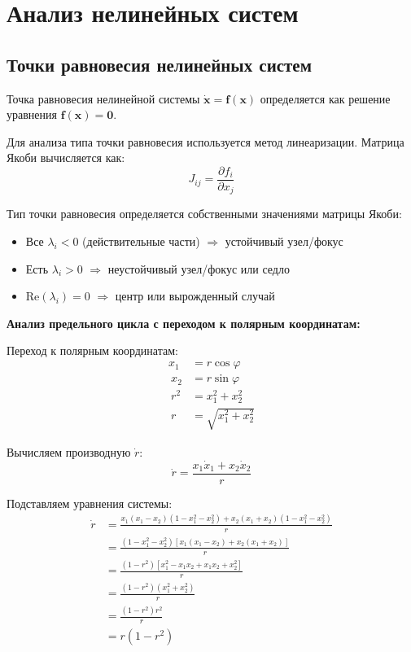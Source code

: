 \section*{Анализ нелинейных систем}

\subsection*{Точки равновесия нелинейных систем}

Точка равновесия нелинейной системы $\dot{\mathbf{x}} = \mathbf{f}(\mathbf{x})$ определяется как решение уравнения $\mathbf{f}(\mathbf{x}) = \mathbf{0}$.

Для анализа типа точки равновесия используется метод линеаризации. Матрица Якоби вычисляется как:
$$J_{ij} = \frac{\partial f_i}{\partial x_j}$$

Тип точки равновесия определяется собственными значениями матрицы Якоби:
\begin{itemize}
\item Все $\lambda_i < 0$ (действительные части) $\Rightarrow$ устойчивый узел/фокус
\item Есть $\lambda_i > 0$ $\Rightarrow$ неустойчивый узел/фокус или седло
\item $\text{Re}(\lambda_i) = 0$ $\Rightarrow$ центр или вырожденный случай
\end{itemize}

\textbf{Анализ предельного цикла с переходом к полярным координатам:}

Переход к полярным координатам:
\begin{align}
x_1 &= r\cos\varphi \\\
x_2 &= r\sin\varphi \\\
r^2 &= x_1^2 + x_2^2 \\\
r &= \sqrt{x_1^2 + x_2^2}
\end{align}

Вычисляем производную $\dot{r}$:
$$\dot{r} = \frac{x_1\dot{x}_1 + x_2\dot{x}_2}{r}$$

Подставляем уравнения системы:
\begin{align}
\dot{r} &= \frac{x_1(x_1 - x_2)(1 - x_1^2 - x_2^2) + x_2(x_1 + x_2)(1 - x_1^2 - x_2^2)}{r} \\\
&= \frac{(1 - x_1^2 - x_2^2)[x_1(x_1 - x_2) + x_2(x_1 + x_2)]}{r} \\\
&= \frac{(1 - r^2)[x_1^2 - x_1x_2 + x_1x_2 + x_2^2]}{r} \\\
&= \frac{(1 - r^2)(x_1^2 + x_2^2)}{r} \\\
&= \frac{(1 - r^2)r^2}{r} \\\
&= r(1 - r^2)
\end{align}

